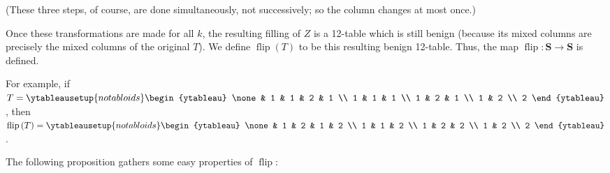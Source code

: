 \documentclass[numbers=enddot,12pt,final,onecolumn,notitlepage]{scrartcl}%
\theoremstyle{definition}
\begin{document}
(These three steps, of course, are done simultaneously, not successively; so
the column changes at most once.)

Once these transformations are made for all $k$, the resulting filling of $Z$
is a 12-table which is still benign (because its mixed columns are precisely
the mixed columns of the original $T$). We define $\operatorname*{flip}\left(
T\right)  $ to be this resulting benign 12-table. Thus, the map
$\operatorname*{flip}:\mathbf{S}\rightarrow\mathbf{S}$ is defined.

For example, if $T=%
\ytableausetup{notabloids}
\begin{ytableau}
\none& 1 & 1 & 2 & 1 \\
1 & 1 & 1 \\
1 & 2 & 1 \\
1 & 2 \\
2
\end{ytableau}%
$, then $\operatorname*{flip}\left(  T\right)  =%
\ytableausetup{notabloids}
\begin{ytableau}
\none& 1 & 2 & 1 & 2 \\
1 & 1 & 2 \\
1 & 2 & 2 \\
1 & 2 \\
2
\end{ytableau}%
$.

The following proposition gathers some easy properties of
$\operatorname*{flip}$:
\end{document}

